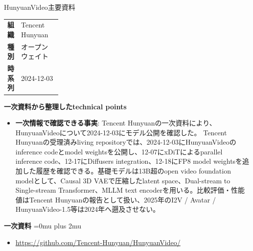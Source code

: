 \begin{technicalnote}{HunyuanVideo}{主要資料}
\begingroup
\begin{tabularx}{\linewidth}{@{}>{\bfseries}p{0.22\linewidth}X@{}}
組織 & Tencent Hunyuan \\
種別 & オープンウェイト \\
時系列 & 2024-12-03 \\
\end{tabularx}
\smallskip
{\bfseries 一次資料から整理したtechnical points}
\begin{itemize}[leftmargin=1.5em,itemsep=0.35em]
\item \textbf{一次情報で確認できる事実}: Tencent Hunyuanの一次資料により、HunyuanVideoについて2024-12-03にモデル公開を確認した。 Tencent Hunyuanの受理済みliving repositoryでは、2024-12-03にHunyuanVideoのinference codeとmodel weightsを公開し、12-07にxDiTによるparallel inference code、12-17にDiffusers integration、12-18にFP8 model weightsを追加した履歴を確認できる。基礎モデルは13B超のopen video foundation modelとして、Causal 3D VAEで圧縮したlatent space、Dual-stream to Single-stream Transformer、MLLM text encoderを用いる。比較評価・性能値はTencent Hunyuanの報告として扱い、2025年のI2V / Avatar / HunyuanVideo-1.5等は2024年へ遡及させない。
\end{itemize}
\begin{minipage}{\linewidth}
\begin{samepage}
{\bfseries 一次資料}
\begingroup\sloppy
\Urlmuskip=0mu plus 2mu\relax
\begin{itemize}[leftmargin=1.5em,itemsep=0.25em]
\item {\scriptsize\url{https://github.com/Tencent-Hunyuan/HunyuanVideo/}}
\end{itemize}
\endgroup
\end{samepage}
\end{minipage}
\endgroup
\end{technicalnote}
\medskip

